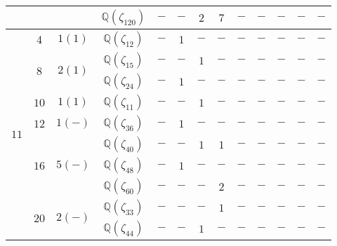\documentclass[12pt,a4paper,halfparskip,headsepline,bibtotocnumbered]{scrreprt}
\theoremstyle{nummermitklammern}
\theoremstyle{nonumberbreak}
\newcommand{\Q}{\mathbb{Q}}
\begin{document}
\begin{table}
\begin{tabular}{|c|c|c|c|c|c|c|c|c|c|c|c|c|}
								&						&							&$\Q(\zeta_{120})$	&$-$	&$-$	&$2$	&$7$	&$-$	&$-$	&$-$	&$-$	&$-$\\ \hline
		\multirow{10}{*}{$11$}	&$4$					&$1(1)$						&$\Q(\zeta_{12})$	&$-$	&$1$	&$-$	&$-$	&$-$	&$-$	&$-$	&$-$	&$-$\\ \cline{2-13}
								&\multirow{2}{*}{$8$}	&\multirow{2}{*}{$2(1)$}	&$\Q(\zeta_{15})$	&$-$	&$-$	&$1$	&$-$	&$-$	&$-$	&$-$	&$-$	&$-$\\ \cline{4-13}
								&						&							&$\Q(\zeta_{24})$	&$-$	&$1$	&$-$	&$-$	&$-$	&$-$	&$-$	&$-$	&$-$\\ \cline{2-13}
								&$10$					&$1(1)$						&$\Q(\zeta_{11})$	&$-$	&$-$	&$1$	&$-$	&$-$	&$-$	&$-$	&$-$	&$-$\\ \cline{2-13}
								&$12$					&$1(-)$						&$\Q(\zeta_{36})$	&$-$	&$1$	&$-$	&$-$	&$-$	&$-$	&$-$	&$-$	&$-$\\ \cline{2-13}
								&\multirow{3}{*}{$16$}	&\multirow{3}{*}{$5(-)$}	&$\Q(\zeta_{40})$	&$-$	&$-$	&$1$	&$1$	&$-$	&$-$	&$-$	&$-$	&$-$\\ \cline{4-13}
								&						&							&$\Q(\zeta_{48})$	&$-$	&$1$	&$-$	&$-$	&$-$	&$-$	&$-$	&$-$	&$-$\\ \cline{4-13}
								&						&							&$\Q(\zeta_{60})$	&$-$	&$-$	&$-$	&$2$	&$-$	&$-$	&$-$	&$-$	&$-$\\ \cline{2-13}
								&\multirow{2}{*}{$20$}	&\multirow{2}{*}{$2(-)$}	&$\Q(\zeta_{33})$	&$-$	&$-$	&$-$	&$1$	&$-$	&$-$	&$-$	&$-$	&$-$\\ \cline{4-13}
								&						&							&$\Q(\zeta_{44})$	&$-$	&$-$	&$1$	&$-$	&$-$	&$-$	&$-$	&$-$	&$-$\\  \hline
	\end{tabular}
\end{table}
\end{document}
